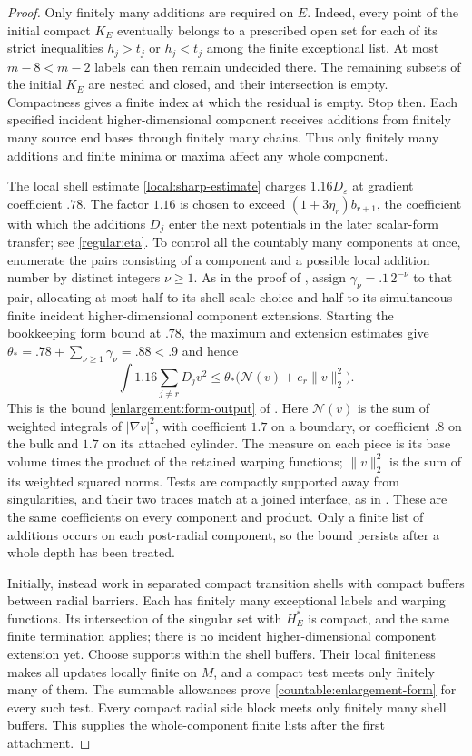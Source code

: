 \begin{proof}
Only finitely many additions are required on $E$. Indeed, every point
of the initial compact $K_E$ eventually belongs to a prescribed open set
for each of its strict inequalities $h_j>t_j$ or $h_j<t_j$ among the finite exceptional list.
At most $m-8<m-2$ labels can then remain undecided there. The remaining
subsets of the initial $K_E$ are nested and closed, and their
intersection is empty. Compactness gives a finite index at which the
residual is empty. Stop then. Each specified incident higher-dimensional component receives additions
from finitely many source end bases through finitely many chains. Thus
only finitely many additions and finite minima or maxima affect any
whole component.

The local shell estimate \eqref{local:sharp-estimate} charges
$1.16D_\varepsilon$ at gradient coefficient $.78$. The factor $1.16$
is chosen to exceed $(1+3\eta_r)b_{r+1}$, the coefficient with which
the additions $D_j$ enter the next potentials in the later scalar-form
transfer; see \eqref{regular:eta}.
To control all the countably many components at once, enumerate the pairs
consisting of a component and a possible local addition number by distinct
integers $\nu\ge1$. As in the proof of , assign
$\gamma_\nu=.1\,2^{-\nu}$ to that pair, allocating at most half to
its shell-scale choice and half to its simultaneous finite incident higher-dimensional component
extensions. Starting the bookkeeping form bound at $.78$, the maximum
and extension estimates give
$\theta_*=.78+\sum_{\nu\ge1}\gamma_\nu=.88<.9$ and hence
\begin{equation}\label{countable:enlargement-form}
 \int1.16\sum_{j\ne r}D_jv^2
 \le\theta_*\bigl(\mathcal N(v)+e_r\|v\|_2^2\bigr).
\end{equation}
This is the bound \eqref{enlargement:form-output} of .
Here $\mathcal N(v)$ is the sum of weighted integrals of
$|\nabla v|^2$, with coefficient $1.7$ on a boundary, or coefficient
$.8$ on the bulk and $1.7$ on its attached cylinder. The measure on
each piece is its base volume times the product of the retained
warping functions; $\|v\|_2^2$ is the sum of its weighted squared norms.
Tests are compactly supported away from singularities, and their
two traces match at a joined interface, as in . These are the
same coefficients on every component and product. Only a finite list of
additions occurs on each post-radial component, so the bound persists
after a whole depth has been treated.

Initially, instead work in separated compact transition shells with
compact buffers between radial barriers. Each has finitely many
exceptional labels and warping functions. Its intersection of the singular set with $H_E^*$ is compact, and the same
finite termination applies; there is no incident higher-dimensional component extension yet. Choose
supports within the shell buffers. Their local finiteness makes all
updates locally finite on $M$, and a compact test meets only finitely
many of them. The summable allowances prove
\eqref{countable:enlargement-form} for every such test. Every compact radial
side block meets only finitely many shell buffers. This supplies the
whole-component finite lists after the first attachment.


\end{proof}
